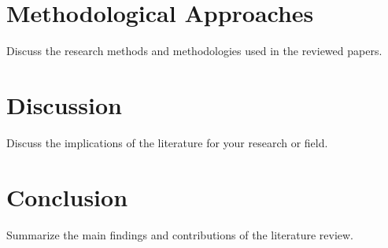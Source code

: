 \documentclass{article}
\begin{document}
\section{Methodological Approaches}
Discuss the research methods and methodologies used in the reviewed papers.

\section{Discussion}
Discuss the implications of the literature for your research or field.

\section{Conclusion}
Summarize the main findings and contributions of the literature review.

\citep{book_example}

\end{document}
